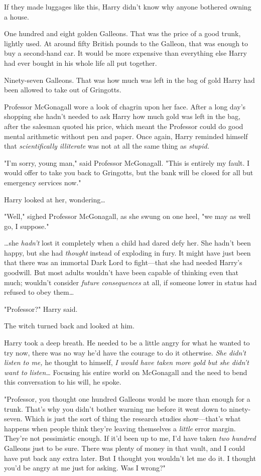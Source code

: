 If they made luggages like this, Harry didn't know why anyone bothered owning a 
house.

One hundred and eight golden Galleons. That was the price of a good trunk, 
lightly used. At around fifty British pounds to the Galleon, that was enough to 
buy a second-hand car. It would be more expensive than everything else Harry 
had ever bought in his whole life all put together.

Ninety-seven Galleons. That was how much was left in the bag of gold Harry had 
been allowed to take out of Gringotts.

Professor McGonagall wore a look of chagrin upon her face. After a long day's 
shopping she hadn't needed to ask Harry how much gold was left in the bag, 
after the salesman quoted his price, which meant the Professor could do good 
mental arithmetic without pen and paper. Once again, Harry reminded himself 
that \emph{scientifically illiterate} was not at all the same thing as 
\emph{stupid.}

"I'm sorry, young man," said Professor McGonagall. "This is entirely my fault. 
I would offer to take you back to Gringotts, but the bank will be closed for 
all but emergency services now."

Harry looked at her, wondering{\ldots}

"Well," sighed Professor McGonagall, as she swung on one heel, "we may as well 
go, I suppose."

{\ldots}she \emph{hadn't} lost it completely when a child had dared defy her. 
She hadn't been happy, but she had \emph{thought} instead of exploding in fury. 
It might have just been that there was an immortal Dark Lord to fight---that 
she had needed Harry's goodwill. But most adults wouldn't have been capable of 
thinking even that much; wouldn't consider \emph{future consequences} at all, 
if someone lower in status had refused to obey them{\ldots}

"Professor?" Harry said.

The witch turned back and looked at him.

Harry took a deep breath. He needed to be a little angry for what he wanted to 
try now, there was no way he'd have the courage to do it otherwise. \emph{She 
didn't listen to me,} he thought to himself, \emph{I would have taken more gold 
but she didn't want to listen{\ldots}} Focusing his entire world on McGonagall 
and the need to bend this conversation to his will, he spoke.

"Professor, you thought one hundred Galleons would be more than enough for a 
trunk. That's why you didn't bother warning me before it went down to 
ninety-seven. Which is just the sort of thing the research studies 
show---that's what happens when people think they're leaving themselves a 
\emph{little} error margin. They're not pessimistic enough. If it'd been up to 
me, I'd have taken \emph{two hundred} Galleons just to be sure. There was 
plenty of money in that vault, and I could have put back any extra later. But I 
thought you wouldn't let me do it. I thought you'd be angry at me just for 
asking. Was I wrong?"

